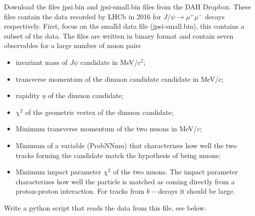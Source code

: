 Download the files jpsi.bin and jpsi-small.bin files  from the DAH Dropbox. These files contain the data recorded by LHCb in 2016 for $J/\psi \rightarrow \mu^+ \mu^-$ decays respectively. First, focus on the smalld data file (jpsi-small.bin), this contains a subset of the data. The files are written in binary format and contain seven observables for a large number of muon pairs
\begin{itemize}
\item  invariant mass of $J\psi$  candidate  in  MeV/$c^2$;
\item transverse momentum of  the dimuon candidate  candidate in MeV/$c$;
\item rapidity $\eta$ of the dimuon candidate;
\item $\chi^2$ of the geometric vertex of the dimuon candidate; 
\item Minimum transverse momentum of the two muons in MeV/$c$;
\item Minimum of a variable (ProbNNmu) that characterizes how well the two tracks forming the candidate match the hypothesis of being muons;
\item Minimum impact parameter $\chi^2$ of the two muons. The impact parameter characterizes how well the particle is matched as coming directly from a proton-proton interaction. For tracks from
 $b-$decays it should be large.
\end{itemize}

Write a python script that reads the data from this file, see below. 


